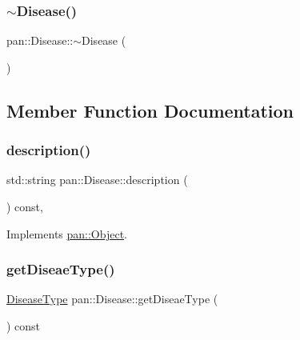 \mbox{\label{classpan_1_1_disease_a0bb1181ae59b3d54f6968a1260726102}} 
\subsubsection{\texorpdfstring{$\sim$\+Disease()}{~Disease()}}
{\footnotesize\ttfamily pan\+::\+Disease\+::$\sim$\+Disease (\begin{DoxyParamCaption}{ }\end{DoxyParamCaption})\hspace{0.3cm}{\ttfamily [default]}}



\subsection{Member Function Documentation}
\mbox{\label{classpan_1_1_disease_a56ea3e8918baf355ad2d1aa253fd9f65}} 
\subsubsection{\texorpdfstring{description()}{description()}}
{\footnotesize\ttfamily std\+::string pan\+::\+Disease\+::description (\begin{DoxyParamCaption}{ }\end{DoxyParamCaption}) const\hspace{0.3cm}{\ttfamily [inline]}, {\ttfamily [virtual]}}



Implements \hyperlink{classpan_1_1_object_a2bb6d3117bb32f5774657c83f118ed8b}{pan\+::\+Object}.

\mbox{\label{classpan_1_1_disease_adf3b7990f5986899944ec7b82131278d}} 
\subsubsection{\texorpdfstring{get\+Diseae\+Type()}{getDiseaeType()}}
{\footnotesize\ttfamily \hyperlink{namespacepan_a48851b51b0aef3f0e1be80df5031d9d7}{Disease\+Type} pan\+::\+Disease\+::get\+Diseae\+Type (\begin{DoxyParamCaption}{ }\end{DoxyParamCaption}) const\hspace{0.3cm}{\ttfamily [inline]}}

